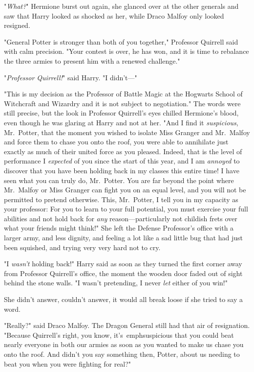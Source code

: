 "\emph{What?}" Hermione burst out again, she glanced over at the other generals 
and saw that Harry looked as shocked as her, while Draco Malfoy only looked 
resigned.

"General Potter is stronger than both of you together," Professor Quirrell said 
with calm precision. "Your contest is over, he has won, and it is time to 
rebalance the three armies to present him with a renewed challenge."

"\emph{Professor Quirrell!}" said Harry. "I didn't---"

"This is my decision as the Professor of Battle Magic at the Hogwarts School of 
Witchcraft and Wizardry and it is not subject to negotiation." The words were 
still precise, but the look in Professor Quirrell's eyes chilled Hermione's 
blood, even though he was glaring at Harry and not at her. "And I find it 
\emph{suspicious}, Mr.~Potter, that the moment you wished to isolate Miss 
Granger and Mr.~Malfoy and force them to chase you onto the roof, you were able 
to annihilate just exactly as much of their united force as you pleased. 
Indeed, that is the level of performance I \emph{expected} of you since the 
start of this year, and I am \emph{annoyed} to discover that you have been 
holding back in my classes this entire time! I have seen what you can truly do, 
Mr.~Potter. You are far beyond the point where Mr.~Malfoy or Miss Granger can 
fight you on an equal level, and you will not be permitted to pretend 
otherwise. This, Mr.~Potter, I tell you in my capacity as your professor: For 
you to learn to your full potential, you must exercise your full abilities and 
not hold back for \emph{any} reason---particularly not childish frets over what 
your friends might think!"
\sbreak
She left the Defense Professor's office with a larger army, and less dignity, 
and feeling a lot like a sad little bug that had just been squished, and trying 
very very hard not to cry.

"I \emph{wasn't} holding back!" Harry said as soon as they turned the first 
corner away from Professor Quirrell's office, the moment the wooden door faded 
out of sight behind the stone walls. "I wasn't pretending, I never \emph{let} 
either of you win!"

She didn't answer, couldn't answer, it would all break loose if she tried to 
say a word.

"Really?" said Draco Malfoy. The Dragon General still had that air of 
resignation. "Because Quirrell's right, you know, it's\ emph{suspicious} that 
you could beat nearly everyone in both our armies as soon as you wanted to make 
us chase you onto the roof. And didn't you say something then, Potter, about us 
needing to beat you when you were fighting for real?"

